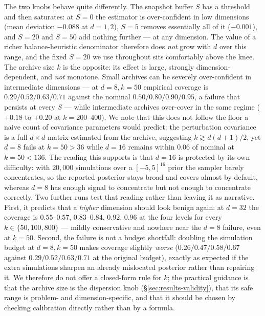 The two knobs behave quite differently. The snapshot buffer $S$ has a threshold and then saturates: at $S=0$ the estimator is over-confident in low dimensions (mean deviation $-0.088$ at $d=1,2$), $S=5$ removes essentially all of it ($-0.001$), and $S=20$ and $S=50$ add nothing further --- at any dimension. The value of a richer balance-heuristic denominator therefore does \emph{not} grow with $d$ over this range, and the fixed $S=20$ we use throughout sits comfortably above the knee. The archive size $k$ is the opposite: its effect is large, strongly dimension-dependent, and \emph{not} monotone. Small archives can be severely over-confident in intermediate dimensions --- at $d=8,k=50$ empirical coverage is $0.29/0.52/0.63/0.71$ against the nominal $0.50/0.80/0.90/0.95$, a failure that persists at every $S$ --- while intermediate archives over-cover in the same regime ($+0.18$ to $+0.20$ at $k=200$--$400$). We note that this does not follow the floor a naive count of covariance parameters would predict: the perturbation covariance is a full $d\times d$ matrix estimated from the archive, suggesting $k\gtrsim d(d{+}1)/2$, yet $d=8$ fails at $k=50>36$ while $d=16$ remains within $0.06$ of nominal at $k=50<136$. The reading this supports is that $d=16$ is protected by its own difficulty: with $20{,}000$ simulations over a $[-5,5]^{16}$ prior the sampler barely concentrates, so the reported posterior stays broad and covers almost by default, whereas $d=8$ has enough signal to concentrate but not enough to concentrate correctly. Two further runs test that reading rather than leaving it as narrative. First, it predicts that a \emph{higher} dimension should look benign again: at $d=32$ the coverage is $0.55$--$0.57$, $0.83$--$0.84$, $0.92$, $0.96$ at the four levels for every $k\in\{50,100,800\}$ --- mildly conservative and nowhere near the $d=8$ failure, even at $k=50$. Second, the failure is not a budget shortfall: doubling the simulation budget at $d=8,k=50$ makes coverage slightly \emph{worse} ($0.26/0.47/0.58/0.67$ against $0.29/0.52/0.63/0.71$ at the original budget), exactly as expected if the extra simulations sharpen an already mislocated posterior rather than repairing it. We therefore do not offer a closed-form rule for $k$; the practical guidance is that the archive size is the dispersion knob (\S\ref{sec:results-validity}), that its safe range is problem- and dimension-specific, and that it should be chosen by checking calibration directly rather than by a formula.

